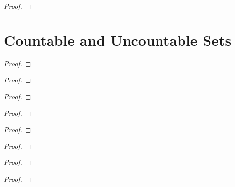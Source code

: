 \begin{proof}
\end{proof}
\newpage

\section{Countable and Uncountable Sets}

\begin{exercise}
\end{exercise}

\begin{proof}
\end{proof}
\newpage

\begin{exercise}
\end{exercise}

\begin{proof}
\end{proof}
\newpage

\begin{exercise}
\end{exercise}

\begin{proof}
\end{proof}
\newpage

\begin{exercise}
\end{exercise}

\begin{proof}
\end{proof}
\newpage

\begin{exercise}
\end{exercise}

\begin{proof}
\end{proof}
\newpage

\begin{exercise}
\end{exercise}

\begin{proof}
\end{proof}
\newpage

\begin{exercise}
\end{exercise}

\begin{proof}
\end{proof}
\newpage

\begin{exercise}
\end{exercise}

\begin{proof}
\end{proof}
\newpage
